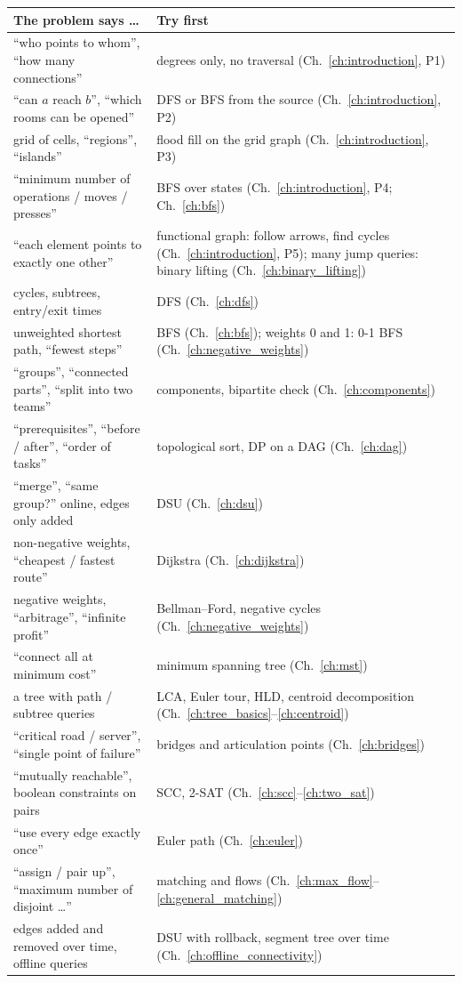 \begin{tabularx}{\linewidth}{@{}>{\raggedright\arraybackslash}p{6.2cm} X@{}}
\toprule
\textbf{The problem says \ldots} & \textbf{Try first} \\
\midrule
``who points to whom'', ``how many connections'' & degrees only, no traversal (Ch.~\ref{ch:introduction}, P1) \\
``can $a$ reach $b$'', ``which rooms can be opened'' & DFS or BFS from the source (Ch.~\ref{ch:introduction}, P2) \\
grid of cells, ``regions'', ``islands'' & flood fill on the grid graph (Ch.~\ref{ch:introduction}, P3) \\
``minimum number of operations / moves / presses'' & BFS over states (Ch.~\ref{ch:introduction}, P4; Ch.~\ref{ch:bfs}) \\
``each element points to exactly one other'' & functional graph: follow arrows, find cycles (Ch.~\ref{ch:introduction}, P5); many jump queries: binary lifting (Ch.~\ref{ch:binary_lifting}) \\
cycles, subtrees, entry/exit times & DFS (Ch.~\ref{ch:dfs}) \\
unweighted shortest path, ``fewest steps'' & BFS (Ch.~\ref{ch:bfs}); weights 0 and 1: 0-1 BFS (Ch.~\ref{ch:negative_weights}) \\
``groups'', ``connected parts'', ``split into two teams'' & components, bipartite check (Ch.~\ref{ch:components}) \\
``prerequisites'', ``before / after'', ``order of tasks'' & topological sort, DP on a DAG (Ch.~\ref{ch:dag}) \\
``merge'', ``same group?'' online, edges only added & DSU (Ch.~\ref{ch:dsu}) \\
non-negative weights, ``cheapest / fastest route'' & Dijkstra (Ch.~\ref{ch:dijkstra}) \\
negative weights, ``arbitrage'', ``infinite profit'' & Bellman--Ford, negative cycles (Ch.~\ref{ch:negative_weights}) \\
``connect all at minimum cost'' & minimum spanning tree (Ch.~\ref{ch:mst}) \\
a tree with path / subtree queries & LCA, Euler tour, HLD, centroid decomposition (Ch.~\ref{ch:tree_basics}--\ref{ch:centroid}) \\
``critical road / server'', ``single point of failure'' & bridges and articulation points (Ch.~\ref{ch:bridges}) \\
``mutually reachable'', boolean constraints on pairs & SCC, 2-SAT (Ch.~\ref{ch:scc}--\ref{ch:two_sat}) \\
``use every edge exactly once'' & Euler path (Ch.~\ref{ch:euler}) \\
``assign / pair up'', ``maximum number of disjoint \ldots'' & matching and flows (Ch.~\ref{ch:max_flow}--\ref{ch:general_matching}) \\
edges added and removed over time, offline queries & DSU with rollback, segment tree over time (Ch.~\ref{ch:offline_connectivity}) \\
\bottomrule
\end{tabularx}
\endgroup

